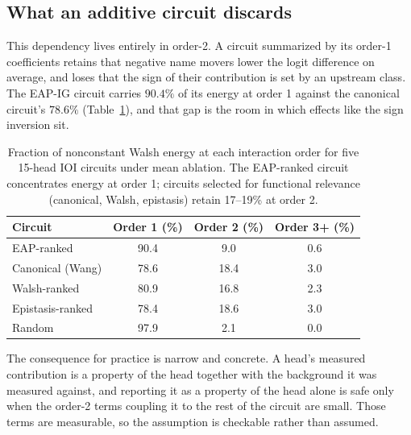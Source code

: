 \subsection{What an additive circuit discards}

This dependency lives entirely in order-2. A circuit summarized by its order-1 coefficients
retains that negative name movers lower the logit difference on average, and loses that the
sign of their contribution is set by an upstream class. The EAP-IG circuit
carries $90.4\%$ of its energy at order 1 against the canonical circuit's $78.6\%$
(Table~\ref{tab:energy}), and that gap is the room in which effects like the sign inversion sit.

\begin{table}[h]
\centering
\begin{tabular}{lccc}
\toprule
Circuit & Order 1 (\%) & Order 2 (\%) & Order 3{+} (\%) \\
\midrule
EAP-ranked           & 90.4 & 9.0  & 0.6 \\
Canonical (Wang)     & 78.6 & 18.4 & 3.0 \\
Walsh-ranked         & 80.9 & 16.8 & 2.3 \\
Epistasis-ranked     & 78.4 & 18.6 & 3.0 \\
Random               & 97.9 & 2.1  & 0.0 \\
\bottomrule
\end{tabular}
\caption{Fraction of nonconstant Walsh energy at each interaction order
for five 15-head IOI circuits under mean ablation. The EAP-ranked circuit
concentrates energy at order 1; circuits selected for functional relevance
(canonical, Walsh, epistasis) retain 17--19\% at order 2.}
\label{tab:energy}
\end{table}

The consequence for practice is narrow and concrete. A head's measured contribution is a
property of the head together with the background it was measured against, and reporting it
as a property of the head alone is safe only when the order-2 terms coupling it to the rest
of the circuit are small. Those terms are measurable, so the assumption is checkable rather
than assumed.

